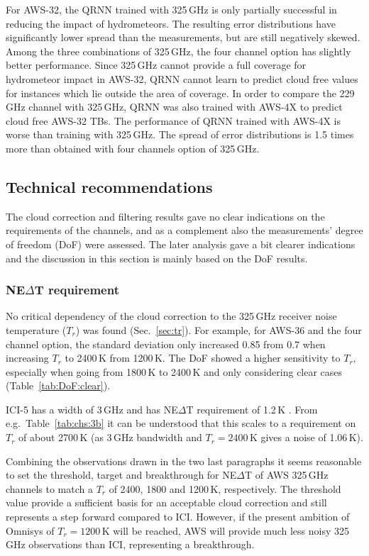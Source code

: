 \documentclass[12pt]{article}
\begin{document}
For AWS-32, the QRNN trained with 325\,GHz is only partially successful in
reducing the impact of hydrometeors. The resulting error distributions have
significantly lower spread than the measurements, but are still negatively
skewed. Among the three combinations of 325\,GHz, the four channel option has
slightly better performance. Since 325\,GHz cannot provide a full coverage for
hydrometeor impact in AWS-32, QRNN cannot learn to predict cloud free values
for instances which lie outside the area of coverage. In order to compare the
229\,GHz channel with 325\,GHz, QRNN was also trained with AWS-4X to predict
cloud free AWS-32 TBs. The performance of QRNN trained with AWS-4X is worse
than training with 325\,GHz. The spread of error distributions is 1.5 times
more than obtained with four channels option of 325\,GHz.



\subsection{Technical recommendations}
%
The cloud correction and filtering results gave no clear indications on the
requirements of the channels, and as a complement also the measurements' degree
of freedom (DoF) were assessed. The later analysis gave a bit clearer
indications and the discussion in this section is mainly based on the DoF results.


\subsubsection{NE$\Delta$T requirement}
%
No critical dependency of the cloud correction to the 325\,GHz receiver noise
temperature ($T_r$) was found (Sec.~\ref{sec:tr}). For example, for AWS-36 and
the four channel option, the standard deviation only increased 0.85 from 0.7
when increasing $T_r$ to 2400\,K from 1200\,K. The DoF showed a higher
sensitivity to $T_r$, especially when going from 1800\,K to 2400\,K and only
considering clear cases (Table~\ref{tab:DoF:clear}).

ICI-5 has a width of 3\,GHz and has NE$\Delta$T requirement of 1.2\,K
\citep{eriksson:towar:20}. From e.g.\ Table~\ref{tab:chs:3b} it can be
understood that this scales to a requirement on $T_r$ of about 2700\,K (as
3\,GHz bandwidth and $T_r=2400$\,K gives a noise of 1.06\,K).

Combining the observations drawn in the two last paragraphs it seems reasonable
to set the threshold, target and breakthrough for NE$\Delta$T of AWS 325\,GHz
channels to match a $T_r$ of 2400, 1800 and 1200\,K, respectively. The
threshold value provide a sufficient basis for an acceptable cloud correction
and still represents a step forward compared to ICI. However, if the present
ambition of Omnisys of $T_r=1200$\,K will be reached, AWS will provide much
less noisy 325\,GHz observations than ICI, representing a breakthrough.
\end{document}

